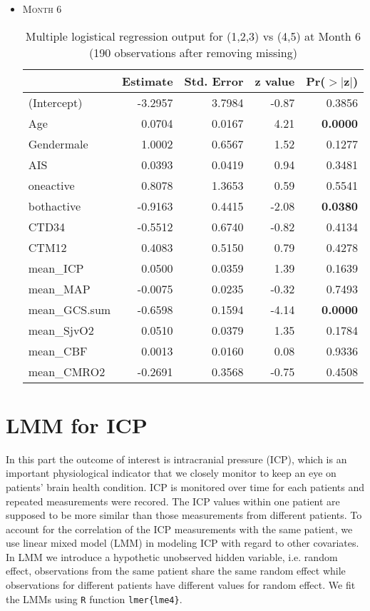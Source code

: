 \documentclass{article}
\begin{document}
\begin{itemize}
\item \textsc{Month 6}
\begin{table}[H]
\centering
\begin{tabular}{lrrrr}
  \hline
 & Estimate & Std. Error & z value & Pr($>$$|$z$|$) \\ 
  \hline
(Intercept) & -3.2957 & 3.7984 & -0.87 & 0.3856 \\ 
  Age & 0.0704 & 0.0167 & 4.21 & {\bf 0.0000} \\ 
  Gendermale & 1.0002 & 0.6567 & 1.52 & 0.1277 \\ 
  AIS & 0.0393 & 0.0419 & 0.94 & 0.3481 \\ 
  oneactive & 0.8078 & 1.3653 & 0.59 & 0.5541 \\ 
  bothactive & -0.9163 & 0.4415 & -2.08 & {\bf 0.0380} \\ 
  CTD34 & -0.5512 & 0.6740 & -0.82 & 0.4134 \\ 
  CTM12 & 0.4083 & 0.5150 & 0.79 & 0.4278 \\ 
  mean\_ICP & 0.0500 & 0.0359 & 1.39 & 0.1639 \\ 
  mean\_MAP & -0.0075 & 0.0235 & -0.32 & 0.7493 \\ 
  mean\_GCS.sum & -0.6598 & 0.1594 & -4.14 & {\bf 0.0000} \\ 
  mean\_SjvO2 & 0.0510 & 0.0379 & 1.35 & 0.1784 \\ 
  mean\_CBF & 0.0013 & 0.0160 & 0.08 & 0.9336 \\ 
  mean\_CMRO2 & -0.2691 & 0.3568 & -0.75 & 0.4508 \\ 
   \hline
\end{tabular}
\caption{Multiple logistical regression output for (1,2,3) vs (4,5) at Month 6 (190 observations after removing missing)}
\end{table}

\end{itemize}






\newpage
\section{LMM for ICP}
In this part the outcome of interest is intracranial pressure (ICP), which is an important physiological indicator that we closely monitor to keep an eye on patients' brain health condition. ICP is monitored over time for each patients and repeated measurements were recored. The ICP values within one patient are supposed to be more similar than those measurements from different patients. To account for the correlation of the ICP measurements with the same patient, we use linear mixed model (LMM) in modeling ICP with regard to other covariates. In LMM we introduce a hypothetic unobserved hidden variable, i.e. random effect, observations from the same patient share the same random effect while observations for different patients have different values for random effect. We fit the LMMs using \verb'R' \cite{team2012r} function \verb'lmer{lme4}'\cite{bates2012lme4}.
\end{document}
